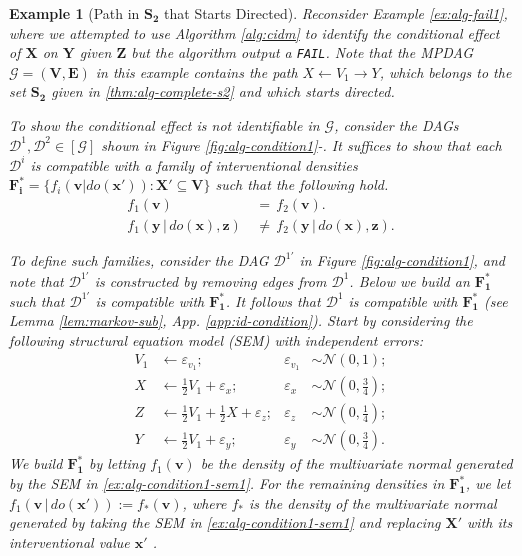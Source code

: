 \documentclass[11pt]{article}
\newtheorem{example}{Example}
\newcommand{\mb}[1]{\mathbf{#1}}
\newcommand{\g}[1][G]{\mathcal{#1}}
\begin{document}
\begin{example}[Path in $\mb{S_2}$ that Starts Directed]
\label{ex:alg-condition1}
    Reconsider Example \ref{ex:alg-fail1}, where we attempted to use Algorithm \ref{alg:cidm} to identify the conditional effect of $\mb{X}$ on $\mb{Y}$ given $\mb{Z}$ but the algorithm output a \texttt{FAIL}. Note that the MPDAG $\g=(\mb{V},\mb{E})$ in this example contains the path $X \gets V_1 \to Y$, which belongs to the set $\mb{S_2}$ given in \eqref{thm:alg-complete-s2} and which starts directed.
    
    To show the conditional effect is not identifiable in $\g$, consider the DAGs $\g[D]^1, \g[D]^2 \in [\g]$ shown in Figure \ref{fig:alg-condition1}-. It suffices to show that each $\g[D]^i$ is compatible with a family of interventional densities $\mb{F^*_i} = \{ f_i(\mb{v}|do(\mb{x'})) : \mb{X'} \subseteq \mb{V} \}$ such that the following hold.
    \begin{align}
        f_1(\mb{v}) &\,=\, f_2(\mb{v}). \label{eq:alg-condition1-a}\\
        f_1(\mb{y} \,|\, do(\mb{x}), \mb{z}) & \,\neq\, f_2(\mb{y} \,|\, do(\mb{x}), \mb{z}). \label{eq:alg-condition1-b}
    \end{align}

    To define such families, consider the DAG $\g[D]^{1'}$ in Figure \ref{fig:alg-condition1}, and note that $\g[D]^{1'}$ is constructed by removing edges from $\g[D]^1$. Below we build an $\mb{F^*_1}$ such that $\g[D]^{1'}$ is compatible with $\mb{F^*_1}$. It follows that $\g[D]^1$ is compatible with $\mb{F^*_1}$ (see Lemma \ref{lem:markov-sub}, App. \ref{app:id-condition}). Start by considering the following structural equation model (SEM) with independent errors:
    \begin{align}
        V_1       &\gets  \varepsilon_{v_1};                   &\varepsilon_{v_1} &\sim \mathcal{N}(0,1); \label{ex:alg-condition1-sem1}\\
        X   &\gets  \tfrac{1}{2}V_1   +  \varepsilon_x;  &\varepsilon_x &\sim \mathcal{N}(0,\tfrac{3}{4});\nonumber\\
        Z   &\gets  \tfrac{1}{2} V_1 + \tfrac{1}{2} X + \varepsilon_z; &\varepsilon_z &\sim \mathcal{N}(0, \tfrac{1}{4});\nonumber\\
        Y   &\gets  \tfrac{1}{2} V_1 + \varepsilon_y;    &\varepsilon_y &\sim \mathcal{N}(0,\tfrac{3}{4}). \nonumber
    \end{align}
    We build $\mb{F^*_1}$ by letting $f_1(\mb{v})$ be the density of the multivariate normal generated by the SEM in \eqref{ex:alg-condition1-sem1}. For the remaining densities in $\mb{F^*_1}$, we let $f_1(\mb{v} \,|\, do(\mb{x'})) := f_*(\mb{v})$, where $f_*$ is  the density of the multivariate normal generated by taking the SEM in \eqref{ex:alg-condition1-sem1} and replacing $\mb{X'}$ with its interventional value $\mb{x'}$ \citep{pearl2009causality}.



\end{example}
\end{document}
